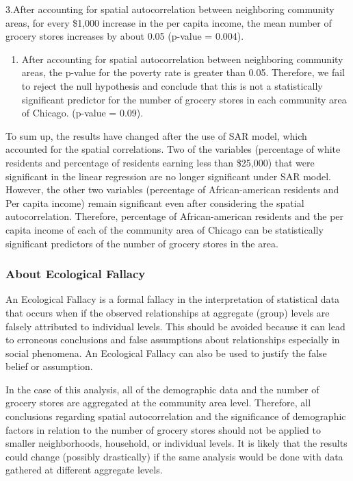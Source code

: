 \documentclass[
]{article}
\providecommand{\tightlist}{%
  \setlength{\itemsep}{0pt}\setlength{\parskip}{0pt}}
\begin{document}
3.After accounting for spatial autocorrelation between neighboring
community areas, for every \$1,000 increase in the per capita income,
the mean number of grocery stores increases by about 0.05 (p-value =
0.004).\\

\begin{enumerate}
\def\labelenumi{\arabic{enumi}.}
\setcounter{enumi}{3}
\tightlist
\item
  After accounting for spatial autocorrelation between neighboring
  community areas, the p-value for the poverty rate is greater than
  0.05. Therefore, we fail to reject the null hypothesis and conclude
  that this is not a statistically significant predictor for the number
  of grocery stores in each community area of Chicago. (p-value =
  0.09).\\
\end{enumerate}

To sum up, the results have changed after the use of SAR model, which
accounted for the spatial correlations. Two of the variables (percentage
of white residents and percentage of residents earning less than
\$25,000) that were significant in the linear regression are no longer
significant under SAR model. However, the other two variables
(percentage of African-american residents and Per capita income) remain
significant even after considering the spatial autocorrelation.
Therefore, percentage of African-american residents and the per capita
income of each of the community area of Chicago can be statistically
significant predictors of the number of grocery stores in the area.

\hypertarget{about-ecological-fallacy}{%
\subsubsection{About Ecological
Fallacy}\label{about-ecological-fallacy}}

An Ecological Fallacy is a formal fallacy in the interpretation of
statistical data that occurs when if the observed relationships at
aggregate (group) levels are falsely attributed to individual levels.
This should be avoided because it can lead to erroneous conclusions and
false assumptions about relationships especially in social phenomena. An
Ecological Fallacy can also be used to justify the false belief or
assumption.

In the case of this analysis, all of the demographic data and the number
of grocery stores are aggregated at the community area level. Therefore,
all conclusions regarding spatial autocorrelation and the significance
of demographic factors in relation to the number of grocery stores
should not be applied to smaller neighborhoods, household, or individual
levels. It is likely that the results could change (possibly
drastically) if the same analysis would be done with data gathered at
different aggregate levels.
\end{document}

